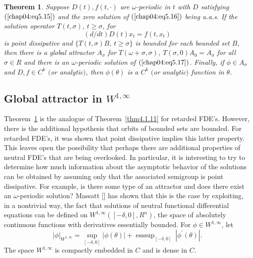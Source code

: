 \documentclass{surv-l}
\theoremstyle{plain}
\newtheorem{theorem}{Theorem}[section]
\theoremstyle{definition}
\numberwithin{equation}{section}
\numberwithin{figure}{chapter}
\begin{document}
\begin{theorem}\label{thm4.5.5} Suppose $D(t), f(t, \cdot)$ are $\omega$-periodic in $t$ with $D$ satisfying $(\ref{chap04:eq5.15})$ and the zero solution of $(\ref{chap04:eq5.16})$ being u.a.s. If the solution operator $T(t, \sigma)$, $t\geq\sigma$, for
\begin{equation}\label{chap04:eq5.17}
(d/dt)D(t)x_{t}=f(t, x_{t})
\end{equation}
is point dissipative and $\{T(t, \sigma)B,\ t\geq\sigma\}$ is bounded for each bounded set $B$, then there is a global attractor $A_{\sigma}$ for $T(\omega+\sigma, \sigma)$, $T(\sigma, 0)A_{0}=A_{\sigma}$ for all $\sigma\in R$ and there is an $\omega$-periodic solution of $(\ref{chap04:eq5.17})$. Finally, if $\phi\in A_{\sigma}$ and $D, f\in C^{k}$ $($or analytic$)$, then $\phi(\theta)$ is a $C^{k}$ $($or analytic$)$ function in $\theta$.
\end{theorem}

\subsection{Global attractor in $W^{1,\infty}$}\label{subsec4.5.3} Theorem~\ref{thm4.5.5} is the analogue of Theorem~\ref{thm4.1.11} for retarded FDE's. However, there is the additional hypothesis that orbits of bounded sets are bounded. For retarded FDE's, it was shown that point dissipative implies this latter property. This leaves open the possibility that perhaps there are additional properties of neutral FDE's that are being overlooked. In particular, it is interesting to try to determine how much information about the asymptotic behavior of the solutions can be obtained by assuming only that the associated semigroup is point dissipative. For example, is there some type of an attractor and does there exist an $\omega$-periodic solution? Massatt [\citeyear{1981massatt}] has shown that this is the case by exploiting, in a nontrivial way, the fact that solutions of neutral functional differential equations can be defined on $W^{1,\infty}([-\delta, 0], R^{n})$, the space of absolutely continuous functions with derivatives essentially bounded. For $\phi\in W^{1,\infty}$, let
\begin{equation*}
|\phi|_{W^{1,\infty}}=\sup_{[-\delta,0]}|\phi(\theta)|+\mathop{\mathrm{ess}\sup}_{[-\delta,0]}\ |\phi^{\prime}(\theta)|.
\end{equation*}
The space $W^{1,\infty}$ is compactly embedded in $C$ and is dense in $C$.
\end{document}
